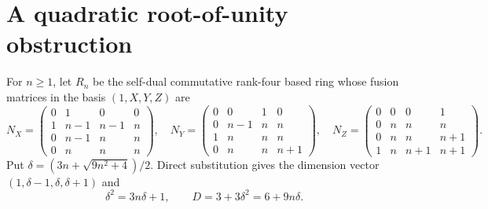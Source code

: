 \section{A quadratic root-of-unity obstruction}\label{sec:quadratic-family}

For $n\geq1$, let $R_n$ be the self-dual commutative rank-four based ring
whose fusion matrices in the basis $(1,X,Y,Z)$ are
\begingroup\small
\[
N_X=\begin{pmatrix}0&1&0&0\\1&n-1&n-1&n\\0&n-1&n&n\\0&n&n&n\end{pmatrix},\quad
N_Y=\begin{pmatrix}0&0&1&0\\0&n-1&n&n\\1&n&n&n\\0&n&n&n+1\end{pmatrix},\quad
N_Z=\begin{pmatrix}0&0&0&1\\0&n&n&n\\0&n&n&n+1\\1&n&n+1&n+1\end{pmatrix}.
\]
\endgroup
Put $\delta=(3n+\sqrt{9n^2+4})/2$. Direct substitution gives the dimension
vector $(1,\delta-1,\delta,\delta+1)$ and
\[
 \delta^2=3n\delta+1,\qquad D=3+3\delta^2=6+9n\delta.
\]

